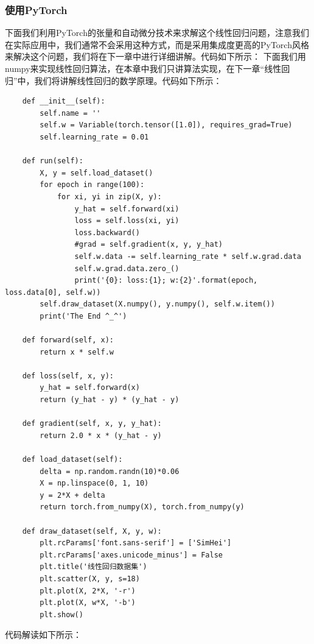 \documentclass[UTF8]{article}
\begin{document}
\subsubsection{使用PyTorch}
下面我们利用PyTorch的张量和自动微分技术来求解这个线性回归问题，注意我们在实际应用中，我们通常不会采用这种方式，而是采用集成度更高的PyTorch风格来解决这个问题，我们将在下一章中进行详细讲解。代码如下所示：
下面我们用numpy来实现线性回归算法，在本章中我们只讲算法实现，在下一章“线性回归”中，我们将讲解线性回归的数学原理。代码如下所示：
\begin{lstlisting}
    def __init__(self):
        self.name = ''
        self.w = Variable(torch.tensor([1.0]), requires_grad=True)
        self.learning_rate = 0.01

    def run(self):
        X, y = self.load_dataset()
        for epoch in range(100):
            for xi, yi in zip(X, y):
                y_hat = self.forward(xi)
                loss = self.loss(xi, yi)
                loss.backward()
                #grad = self.gradient(x, y, y_hat)
                self.w.data -= self.learning_rate * self.w.grad.data
                self.w.grad.data.zero_()
                print('{0}: loss:{1}; w:{2}'.format(epoch, loss.data[0], self.w))
        self.draw_dataset(X.numpy(), y.numpy(), self.w.item())
        print('The End ^_^')

    def forward(self, x):
        return x * self.w
    
    def loss(self, x, y):
        y_hat = self.forward(x)
        return (y_hat - y) * (y_hat - y)

    def gradient(self, x, y, y_hat):
        return 2.0 * x * (y_hat - y)

    def load_dataset(self):
        delta = np.random.randn(10)*0.06
        X = np.linspace(0, 1, 10)
        y = 2*X + delta
        return torch.from_numpy(X), torch.from_numpy(y)

    def draw_dataset(self, X, y, w):
        plt.rcParams['font.sans-serif'] = ['SimHei']
        plt.rcParams['axes.unicode_minus'] = False
        plt.title('线性回归数据集')
        plt.scatter(X, y, s=18)
        plt.plot(X, 2*X, '-r')
        plt.plot(X, w*X, '-b')
        plt.show()
\end{lstlisting}
代码解读如下所示：
\end{document}
